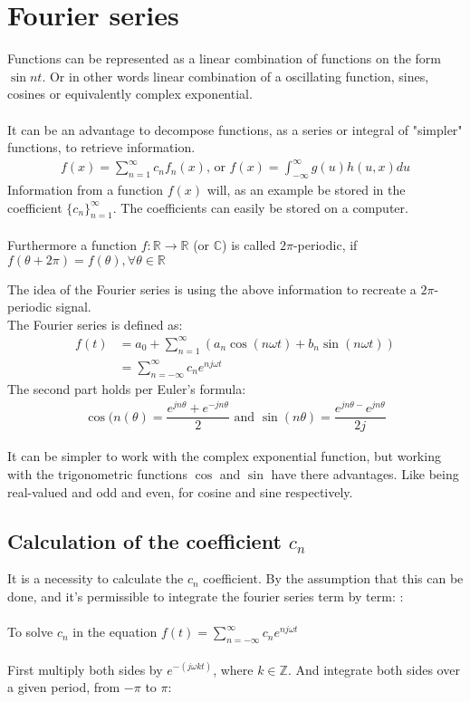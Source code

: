 \section{Fourier series}
Functions can be represented as a linear combination of functions on the form $\sin nt$.
Or in other words linear combination of a oscillating function, sines, cosines or equivalently complex exponential.
\\\\
It can be an advantage to decompose functions, as a series or integral of "simpler" functions, to retrieve information.
\begin{align*}
	f(x) = \sum_{n=1}^\infty c_n f_n(x)\text{, or } f(x)= \int_{-\infty}^\infty g(u) h(u,x) du
\end{align*}
Information from a function $f(x)$ will, as an example be stored in the coefficient $\{c_n\}_{n=1}^\infty$.
The coefficients can easily be stored on a computer.
\\\\ 
Furthermore a function $f: \mathbb{R}\to\mathbb{R}$ (or $\mathbb{C}$) is called $2\pi$-periodic, if $f(\theta + 2\pi) = f(\theta), \forall\theta\in\mathbb{R}$

The idea of the Fourier series is using the above information to recreate a $2\pi$- periodic signal.\\
The Fourier series is defined as:
\begin{align*}
	f(t) &= a_0 + \sum_{n=1}^\infty(a_n \cos(n \omega t) + b_n \sin(n \omega t))\\
	&= \sum_{n=-\infty}^{\infty} c_n e^{n j\omega t} 
\end{align*}
The second part holds per Euler's formula:
\begin{align*}
	\cos(n(\theta) = \dfrac{e^{j n \theta} + e^{-j n \theta}}{2} \text{ and } \sin(n \theta) = \dfrac{e^{jn\theta-}e^{jn\theta}}{2j}
\end{align*}

It can be simpler to work with the complex exponential function, but working with the trigonometric functions $\cos$ and $\sin$ have there advantages. 
Like being real-valued and odd and even, for cosine and sine respectively.

\subsection{Calculation of the coefficient $c_n$}
It is a necessity to calculate the $c_n$ coefficient.
By the assumption that this can be done, and it's permissible to integrate the fourier series term by term: :\\
\\
To solve $c_n$ in the equation $f(t)= \sum_{n=-\infty}^{\infty} c_n e^{n j\omega t}$
\\\\
First multiply both sides by $e^{-(j\omega k t)}$, where $k\in \mathbb{Z}$. And integrate both sides over a given period, from $-\pi$ to $\pi$:

